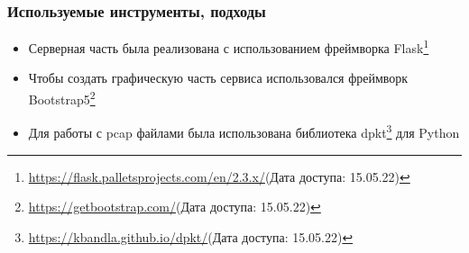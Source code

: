 \documentclass[aspectratio=169]{beamer}
\begin{document}





\begin{frame}
	\frametitle{Используемые инструменты, подходы}
	\begin{itemize}
		\item Серверная часть была реализована с использованием фреймворка Flask\footnote{\url{https://flask.palletsprojects.com/en/2.3.x/}(Дата доступа: 15.05.22)}
		\item Чтобы создать графическую часть сервиса использовался фреймворк Bootstrap5\footnote{\url{https://getbootstrap.com/}(Дата доступа: 15.05.22)}
		\item Для работы с pcap файлами была использована библиотека dpkt\footnote{\url{https://kbandla.github.io/dpkt/}(Дата доступа: 15.05.22)} для Python
	\end{itemize}
\end{frame}
\end{document}
